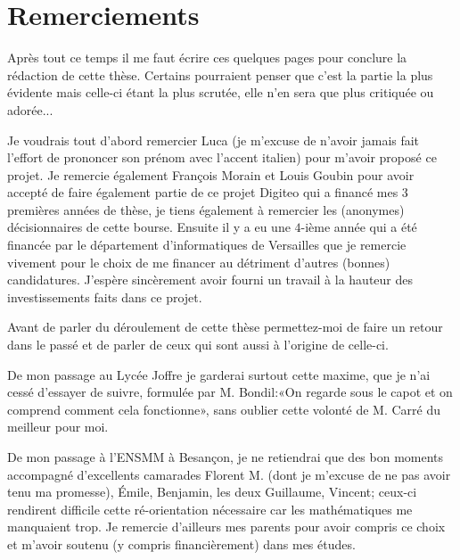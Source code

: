 \documentclass[10pt,a4paper]{book}
\theoremstyle{plain}
\theoremstyle{definition}
\theoremstyle{definition}
\theoremstyle{definition}
\theoremstyle{definition}
\theoremstyle{definition}
\theoremstyle{remark}
\theoremstyle{remark}
\theoremstyle{definition}
\begin{document}
\normalsize

\mainmatter
\maketitle
\chapter*{Remerciements}

Après tout ce temps il me faut écrire ces quelques pages pour conclure la 
rédaction de cette thèse. Certains pourraient penser que c'est la partie la 
plus évidente mais celle-ci étant la plus scrutée, elle n'en sera que plus 
critiquée ou adorée...

Je voudrais tout d'abord remercier Luca (je m'excuse de n'avoir jamais fait 
l'effort de prononcer son prénom avec l'accent italien) pour m'avoir proposé ce
projet. Je remercie également François Morain et Louis Goubin pour avoir 
accepté de faire également partie de ce projet Digiteo qui a financé mes 3 
premières années de thèse, je tiens également à remercier les (anonymes) 
décisionnaires de cette bourse. Ensuite il y a eu une $4$-ième année qui a été 
financée par le département d'informatiques de Versailles que je remercie 
vivement pour le choix de me financer au détriment d'autres (bonnes) 
candidatures. J'espère sincèrement avoir fourni un travail à la hauteur des
investissements faits dans ce projet.

Avant de parler du déroulement de cette thèse permettez-moi de faire un retour 
dans le passé et de parler de ceux qui sont aussi à l'origine de celle-ci.

De mon passage au Lycée Joffre je garderai surtout cette maxime, que je n'ai 
cessé d'essayer de suivre, formulée par M. Bondil:«On regarde sous le capot et 
on comprend comment cela fonctionne», sans oublier cette volonté de M. Carré du
meilleur pour moi.

De mon passage à l'ENSMM à Besançon, je ne retiendrai que des bon moments 
accompagné d'excellents camarades Florent M. (dont je m'excuse de ne pas avoir
tenu ma promesse), Émile, Benjamin, les deux Guillaume, Vincent; ceux-ci rendirent 
difficile cette ré-orientation nécessaire car les mathématiques me manquaient
trop. Je remercie d'ailleurs mes parents pour avoir compris ce choix et m'avoir
soutenu (y compris financièrement) dans mes études.
\end{document}
